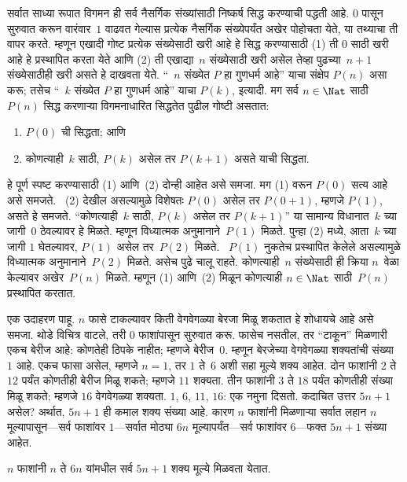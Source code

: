 \documentclass[../../../include/open-logic-section]{subfiles}
\begin{document}


सर्वात साध्या रूपात विगमन ही सर्व नैसर्गिक संख्यांसाठी निष्कर्ष सिद्ध करण्याची पद्धती आहे. $0$ पासून सुरुवात करून वारंवार~$1$ वाढवत गेल्यास प्रत्येक नैसर्गिक संख्येपर्यंत अखेर पोहोचता येते, या तथ्याचा ती वापर करते. म्हणून एखादी गोष्ट प्रत्येक संख्येसाठी खरी आहे हे सिद्ध करण्यासाठी (1) ती $0$ साठी खरी आहे हे प्रस्थापित करता येते आणि (2) ती एखाद्या~$n$ संख्येसाठी खरी असेल तेव्हा पुढच्या~$n+1$ संख्येसाठीही खरी असते हे दाखवता येते. “~$n$ संख्येत $P$ हा गुणधर्म आहे” याचा संक्षेप $P(n)$ असा करू; तसेच “~$k$ संख्येत $P$ हा गुणधर्म आहे” याचा $P(k)$, इत्यादी. मग सर्व $n \in \Nat$ साठी $P(n)$ सिद्ध करणाऱ्या विगमनाधारित सिद्धतेत पुढील गोष्टी असतात:
\begin{enumerate}
\item $P(0)$ ची सिद्धता; आणि
\item कोणत्याही~$k$ साठी, $P(k)$ असेल तर $P(k+1)$ असते याची सिद्धता.
\end{enumerate}
हे पूर्ण स्पष्ट करण्यासाठी (1) आणि~(2) दोन्ही आहेत असे समजा. मग (1) वरून $P(0)$ सत्य आहे असे समजते. ~(2) देखील असल्यामुळे विशेषतः $P(0)$ असेल तर $P(0+1)$, म्हणजे $P(1)$, असते हे समजते. “कोणत्याही~$k$ साठी, $P(k)$ असेल तर $P(k+1)$” या सामान्य विधानात~$k$ च्या जागी~$0$ ठेवल्यावर हे मिळते. म्हणून विध्यात्मक अनुमानाने~$P(1)$ मिळते. पुन्हा (2) मध्ये, आता~$k$ च्या जागी $1$ घेतल्यावर, $P(1)$ असेल तर~$P(2)$ मिळते. ~$P(1)$ नुकतेच प्रस्थापित केलेले असल्यामुळे विध्यात्मक अनुमानाने~$P(2)$ मिळते. असेच पुढे चालू राहते. कोणत्याही~$n$ संख्येसाठी ही क्रिया $n$~वेळा केल्यावर अखेर~$P(n)$ मिळते. म्हणून (1) आणि~(2) मिळून कोणत्याही $n \in \Nat$ साठी~$P(n)$ प्रस्थापित करतात.

एक उदाहरण पाहू. $n$ फासे टाकल्यावर किती वेगवेगळ्या बेरजा मिळू शकतात हे शोधायचे आहे असे समजा. थोडे विचित्र वाटले, तरी $0$ फाशांपासून सुरुवात करू. फासेच नसतील, तर “टाकून” मिळणारी एकच बेरीज आहे: कोणतेही ठिपके नाहीत; म्हणजे बेरीज~$0$. म्हणून बेरजेच्या वेगवेगळ्या शक्यतांची संख्या~$1$ आहे. एकच फासा असेल, म्हणजे $n=1$, तर $1$ ते~$6$ अशी सहा मूल्ये शक्य आहेत. दोन फाशांनी $2$ ते $12$ पर्यंत कोणतीही बेरीज मिळू शकते; म्हणजे $11$ शक्यता. तीन फाशांनी $3$ ते $18$ पर्यंत कोणतीही संख्या मिळू शकते; म्हणजे $16$ वेगवेगळ्या शक्यता. $1$, $6$, $11$, $16$: एक नमुना दिसतो. कदाचित उत्तर $5n+1$ असेल? अर्थात, $5n+1$ ही कमाल शक्य संख्या आहे. कारण $n$ फाशांनी मिळणाऱ्या सर्वात लहान $n$ मूल्यापासून---सर्व फाशांवर $1$---सर्वात मोठ्या $6n$ मूल्यापर्यंत---सर्व फाशांवर $6$---फक्त $5n+1$ संख्या आहेत.

\begin{thm}
$n$ फाशांनी $n$ ते $6n$ यांमधील सर्व $5n+1$ शक्य मूल्ये मिळवता येतात.
\end{thm}
\end{document}
